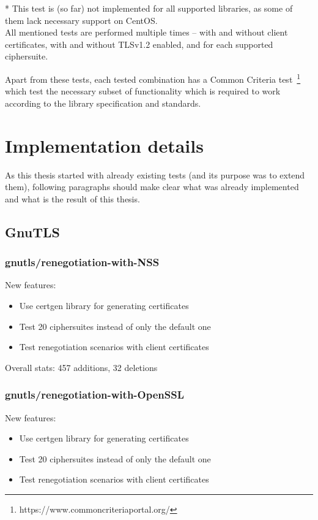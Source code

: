     * This test is (so far) not implemented for all supported libraries, as
    some of them lack necessary support on CentOS. \\

    All mentioned tests are performed multiple times -- with and without
    client certificates, with and without TLSv1.2 enabled, and for each
    supported ciphersuite.

    Apart from these tests, each tested combination has a Common Criteria
    test~\footnote{https://www.commoncriteriaportal.org/} which test
    the necessary subset of functionality which is required to work according
    to the library specification and standards.

\section{Implementation details}
    As this thesis started with already existing tests (and its purpose was
    to extend them), following paragraphs should make clear what was already
    implemented and what is the result of this thesis.

\subsection{GnuTLS}
\subsubsection{gnutls/renegotiation-with-NSS}
    New features:
    \begin{itemize}
        \item Use certgen library for generating certificates
        \item Test 20 ciphersuites instead of only the default one
        \item Test renegotiation scenarios with client certificates
    \end{itemize}

    Overall stats: 457 additions, 32 deletions

\subsubsection{gnutls/renegotiation-with-OpenSSL}
    New features:
    \begin{itemize}
        \item Use certgen library for generating certificates
        \item Test 20 ciphersuites instead of only the default one
        \item Test renegotiation scenarios with client certificates
    \end{itemize}

